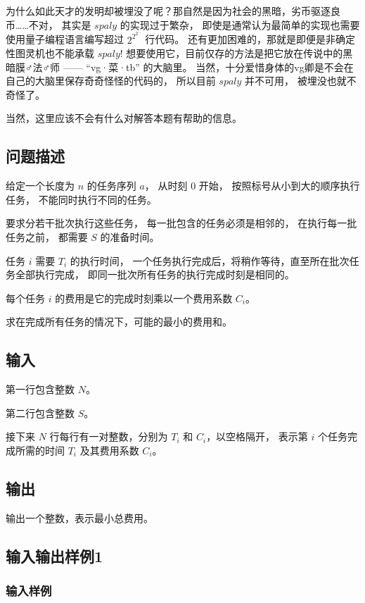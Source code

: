 \documentclass[UTF8]{ctexart}
\begin{document}
为什么如此天才的发明却被埋没了呢？那自然是因为社会的黑暗，劣币驱逐良币……不对， 其实是 $spaly$ 的实现过于繁杂， 即使是通常认为最简单的实现也需要使用量子编程语言编写超过 $2^{2^{2^{\cdots}}}$ 行代码。 还有更加困难的，那就是即便是非确定性图灵机也不能承载 $spaly$! 想要使用它，目前仅存的方法是把它放在传说中的黑暗膜♂法♂师 —— “vg·菜·tb” 的大脑里。 当然，十分爱惜身体的vg卿是不会在自己的大脑里保存奇奇怪怪的代码的， 所以目前 $spaly$ 并不可用， 被埋没也就不奇怪了。

当然，这里应该不会有什么对解答本题有帮助的信息。

\subsection{问题描述}

给定一个长度为 $n$ 的任务序列 $a$， 从时刻 $0$ 开始， 按照标号从小到大的顺序执行任务， 不能同时执行不同的任务。

要求分若干批次执行这些任务， 每一批包含的任务必须是相邻的， 在执行每一批任务之前， 都需要 $S$ 的准备时间。

任务 $i$ 需要 $T_i$ 的执行时间， 一个任务执行完成后，将稍作等待，直至所在批次任务全部执行完成， 即同一批次所有任务的执行完成时刻是相同的。

每个任务 $i$ 的费用是它的完成时刻乘以一个费用系数 $C_i$。

求在完成所有任务的情况下，可能的最小的费用和。

\subsection{输入} 

第一行包含整数 $N$。

第二行包含整数 $S$。

接下来 $N$ 行每行有一对整数，分别为 $T_i$ 和 $C_i$，以空格隔开， 表示第 $i$ 个任务完成所需的时间 $T_i$ 及其费用系数 $C_i$。

\subsection{输出}

输出一个整数，表示最小总费用。

\subsection{输入输出样例1}

\subsubsection{输入样例}
\end{document}
